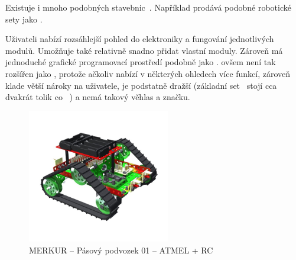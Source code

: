 
Existuje i mnoho podobných stavebnic~\cite{intorobotics_BestAlternativesToLegoMindstormsKits}. 
Například \fischerT prodává podobné robotické sety jako \lego{~}\cite{fischertechnik_ROBOTICS}. 

Uživateli nabízí rozsáhlejší pohled do elektroniky a fungování jednotlivých modulů. 
Umožňuje také relativně snadno přidat vlastní moduly.
Zároveň má jednoduché grafické programovací prostředí podobně jako \lego. 
\FischerT{ }ovšem není tak rozšířen jako \legoM, protože ačkoliv nabízí v některých ohledech více funkcí, zároveň klade větší nároky na uživatele, je podstatně dražší (základní set~\cite{fischertechnik_HelagoEshop_ROBOTICS-TXT-COMPETITION-SET} stojí cca dvakrát tolik co ~\cite{lego_eduxeEshop_CoreSet}) a nemá takový věhlas a značku.



\begin{figure}[h]
	\centering
	\includegraphics[width=235px]{images/MERKUR_Pasovy-podvozek-01_ATMEL+RC.jpg}
	\caption[MERKUR -- Pásový podvozek 01 -- ATMEL + RC]{MERKUR -- Pásový podvozek 01 -- ATMEL + RC\protect\footnotemark}
	\label{fig:MERKUR_Pasovy-podvozek-01_ATMEL+RC}
\end{figure}

